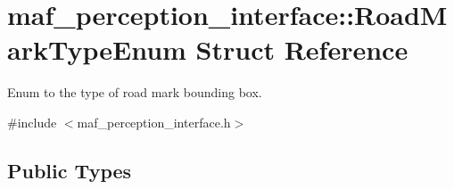 \hypertarget{structmaf__perception__interface_1_1RoadMarkTypeEnum}{}\section{maf\+\_\+perception\+\_\+interface\+:\+:Road\+Mark\+Type\+Enum Struct Reference}
\label{structmaf__perception__interface_1_1RoadMarkTypeEnum}


Enum to the type of road mark bounding box.  




{\ttfamily \#include $<$maf\+\_\+perception\+\_\+interface.\+h$>$}

\subsection*{Public Types}
